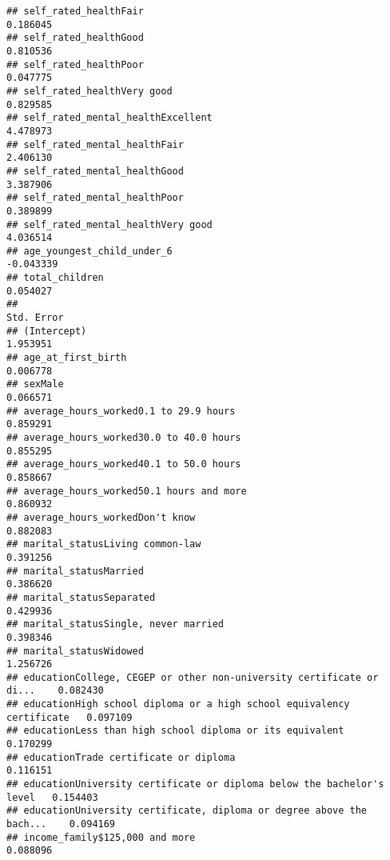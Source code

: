 \documentclass[
]{article}
\begin{document}
\begin{verbatim}
## self_rated_healthFair                                                  0.186045
## self_rated_healthGood                                                  0.810536
## self_rated_healthPoor                                                  0.047775
## self_rated_healthVery good                                             0.829585
## self_rated_mental_healthExcellent                                      4.478973
## self_rated_mental_healthFair                                           2.406130
## self_rated_mental_healthGood                                           3.387906
## self_rated_mental_healthPoor                                           0.389899
## self_rated_mental_healthVery good                                      4.036514
## age_youngest_child_under_6                                            -0.043339
## total_children                                                         0.054027
##                                                                       Std. Error
## (Intercept)                                                             1.953951
## age_at_first_birth                                                      0.006778
## sexMale                                                                 0.066571
## average_hours_worked0.1 to 29.9 hours                                   0.859291
## average_hours_worked30.0 to 40.0 hours                                  0.855295
## average_hours_worked40.1 to 50.0 hours                                  0.858667
## average_hours_worked50.1 hours and more                                 0.860932
## average_hours_workedDon't know                                          0.882083
## marital_statusLiving common-law                                         0.391256
## marital_statusMarried                                                   0.386620
## marital_statusSeparated                                                 0.429936
## marital_statusSingle, never married                                     0.398346
## marital_statusWidowed                                                   1.256726
## educationCollege, CEGEP or other non-university certificate or di...    0.082430
## educationHigh school diploma or a high school equivalency certificate   0.097109
## educationLess than high school diploma or its equivalent                0.170299
## educationTrade certificate or diploma                                   0.116151
## educationUniversity certificate or diploma below the bachelor's level   0.154403
## educationUniversity certificate, diploma or degree above the bach...    0.094169
## income_family$125,000 and more                                          0.088096

\end{verbatim}
\end{document}
